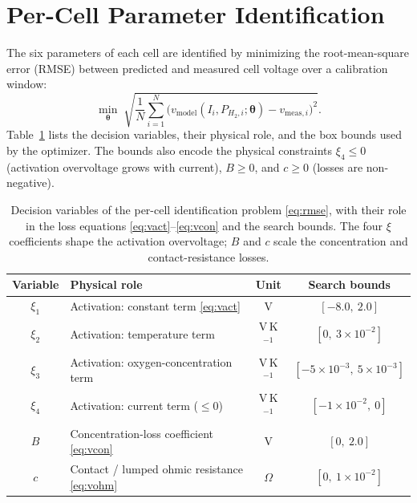 \section{Per-Cell Parameter Identification}
\label{sec:identification}

The six parameters of each cell are identified by minimizing the root-mean-square
error (RMSE) between predicted and measured cell voltage over a calibration
window:
\begin{equation}
    \min_{\boldsymbol{\theta}}\;
    \sqrt{\frac{1}{N}\sum_{i=1}^{N}
        \bigl(v_{\text{model}}(I_i,P_{H_2,i};\boldsymbol{\theta})-v_{\text{meas},i}\bigr)^2}.
    \label{eq:rmse}
\end{equation}
Table~\ref{tab:opt-vars} lists the decision variables, their physical role, and
the box bounds used by the optimizer. The bounds also encode the physical
constraints $\xi_4\le 0$ (activation overvoltage grows with current),
$B\ge 0$, and $c\ge 0$ (losses are non-negative).

\begin{table}[t]
    \centering
    \caption[Optimization variables for the per-cell identification]{Decision
             variables of the per-cell identification problem \eqref{eq:rmse},
             with their role in the loss equations
             \eqref{eq:vact}--\eqref{eq:vcon} and the search bounds. The four
             $\xi$ coefficients shape the activation overvoltage; $B$ and $c$
             scale the concentration and contact-resistance losses.}
    \label{tab:opt-vars}
    \small
    \begin{tabular}{clcc}
        \toprule
        \textbf{Variable} & \textbf{Physical role} & \textbf{Unit} & \textbf{Search bounds} \\
        \midrule
        $\xi_1$ & Activation: constant term \eqref{eq:vact}            & V             & $[-8.0,\ 2.0]$ \\
        $\xi_2$ & Activation: temperature term                         & V\,K$^{-1}$   & $[0,\ 3\times10^{-2}]$ \\
        $\xi_3$ & Activation: oxygen-concentration term                & V\,K$^{-1}$   & $[-5\times10^{-3},\ 5\times10^{-3}]$ \\
        $\xi_4$ & Activation: current term ($\le 0$)                   & V\,K$^{-1}$   & $[-1\times10^{-2},\ 0]$ \\
        $B$     & Concentration-loss coefficient \eqref{eq:vcon}       & V             & $[0,\ 2.0]$ \\
        $c$     & Contact / lumped ohmic resistance \eqref{eq:vohm}    & $\Omega$      & $[0,\ 1\times10^{-2}]$ \\
        \bottomrule
    \end{tabular}
\end{table}

